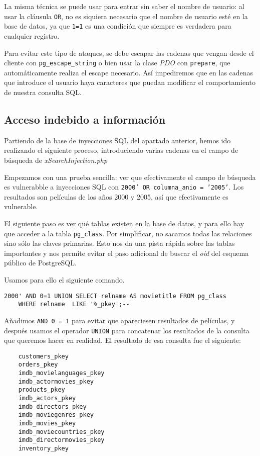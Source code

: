 \documentclass{article}
\begin{document}
La misma técnica se puede usar para entrar sin saber el nombre de usuario: al usar la cláusula \texttt{OR}, no es siquiera necesario que el nombre de usuario esté en la base de datos, ya que \texttt{1=1} es una condición que siempre es verdadera para cualquier registro.

Para evitar este tipo de ataques, se debe escapar las cadenas que vengan desde el cliente con \texttt{pg\_escape\_string} o bien usar la clase \textit{PDO} con \texttt{prepare}, que automáticamente realiza el escape necesario. Así impediremos que en las cadenas que introduce el usuario haya caracteres que puedan modificar el comportamiento de nuestra consulta SQL.

\subsection{Acceso indebido a información}

Partiendo de la base de inyecciones SQL del apartado anterior, hemos ido realizando el siguiente proceso, introduciendo varias cadenas en el campo de búsqueda de \textit{xSearchInjection.php}

Empezamos con una prueba sencilla: ver que efectivamente el campo de búsqueda es vulnerabble a inyecciones SQL con \texttt{2000' OR columna\_anio = '2005'}. Los resultados son películas de los años 2000 y 2005, así que efectivamente es vulnerable.

El siguiente paso es ver qué tablas existen en la base de datos, y para ello hay que acceder a la tabla \texttt{pg\_class}. Por simplificar, no sacamos todas las relaciones sino sólo las claves primarias. Esto nos da una pista rápida sobre las tablas importantes y nos permite evitar el paso adicional de buscar el \textit{oid} del esquema público de PostgreSQL.

Usamos para ello el siguiente comando.

\begin{Verbatim}[frame = lines]
2000' AND 0=1 UNION SELECT relname AS movietitle FROM pg_class
	WHERE relname  LIKE '%_pkey';--
\end{Verbatim}

Añadimos \texttt{AND 0 = 1} para evitar que apareciesen resultados de películas, y después usamos el operador \texttt{UNION} para concatenar los resultados de la consulta que queremos hacer en realidad. El resultado de esa consulta fue el siguiente:

\begin{Verbatim}
    customers_pkey
    orders_pkey
    imdb_movielanguages_pkey
    imdb_actormovies_pkey
    products_pkey
    imdb_actors_pkey
    imdb_directors_pkey
    imdb_moviegenres_pkey
    imdb_movies_pkey
    imdb_moviecountries_pkey
    imdb_directormovies_pkey
    inventory_pkey
\end{Verbatim}
\end{document}
